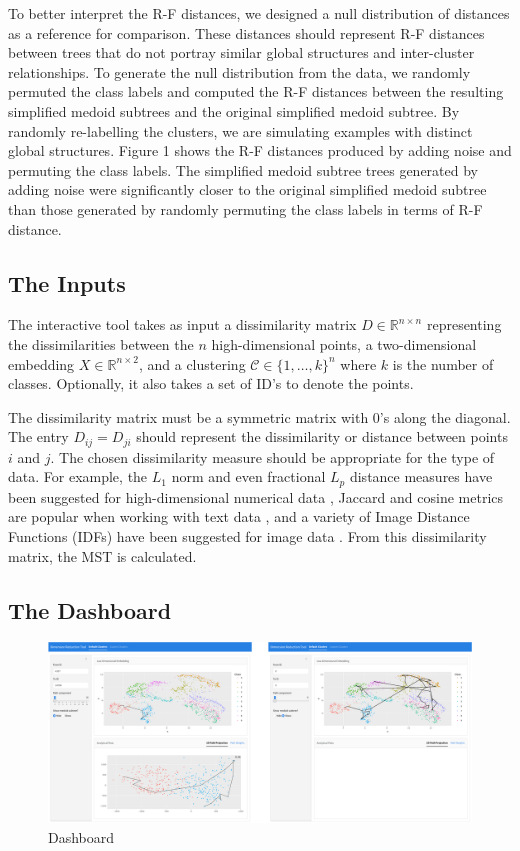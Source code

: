 \documentclass{article}
\begin{document}
To better interpret the R-F distances, we designed a null distribution of distances as a reference for comparison. These distances should represent R-F distances between trees that do not portray similar global structures and inter-cluster relationships. To generate the null distribution from the data, we randomly permuted the class labels and computed the R-F distances between the resulting simplified medoid subtrees and the original simplified medoid subtree. By randomly re-labelling the clusters, we are simulating examples with distinct global structures. Figure 1 shows the R-F distances produced by adding noise and permuting the class labels. The simplified medoid subtree trees generated by adding noise were significantly closer to the original simplified medoid subtree than those generated by randomly permuting the class labels in terms of R-F distance.

\subsection{The Inputs}
The interactive tool takes as input a dissimilarity matrix $D \in \mathbb{R}^{n \times n}$ representing the dissimilarities between the $n$ high-dimensional points, a two-dimensional embedding $X \in \mathbb{R}^{n \times 2}$, and a clustering $\mathcal{C} \in \{1, \hdots, k\}^n$ where $k$ is the number of classes. Optionally, it also takes a set of ID's to denote the points.

The dissimilarity matrix must be a symmetric matrix with 0's along the diagonal. The entry $D_{ij} = D_{ji}$ should represent the dissimilarity or distance between points $i$ and $j$. The chosen dissimilarity measure should be appropriate for the type of data. For example, the $L_1$ norm and even fractional $L_p$ distance measures have been suggested for high-dimensional numerical data \cite{fractional Lp norms}, Jaccard and cosine metrics are popular when working with text data \cite{text data}, and a variety of Image Distance Functions (IDFs) have been suggested for image data \cite{image metrics}. From this dissimilarity matrix, the MST is calculated.

\subsection{The Dashboard}

\renewcommand{\figurename}{Figures}
\renewcommand{\thefigure}{2a and 2b}
\begin{figure}[!b]
\centering
\includegraphics[scale=0.45]{dashboard}
\caption{Dashboard}
\end{figure}
\end{document}
